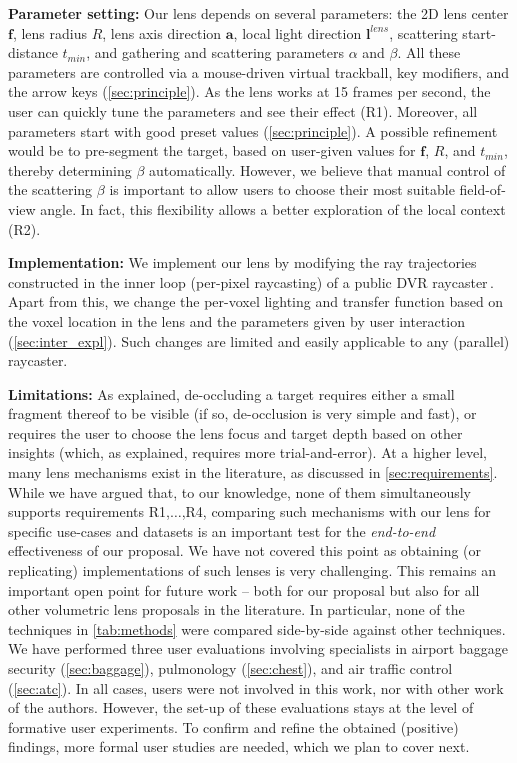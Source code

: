 \par \textbf{Parameter setting:} Our lens depends on several parameters: the 2D lens center $\mathbf{f}$, lens radius $R$, lens axis direction $\mathbf{a}$, local light direction $\mathbf{l}^{lens}$, scattering start-distance $t_{min}$, and gathering and scattering parameters $\alpha$ and $\beta$. All these parameters are controlled via a mouse-driven virtual trackball, key modifiers, and the arrow keys (\autoref{sec:principle}). As the lens works at 15 frames per second, the user can quickly tune the parameters and see their effect (R1). Moreover, all parameters start with good preset values (\autoref{sec:principle}). A possible refinement would be to pre-segment the target, based on user-given values for $\mathbf{f}$, $R$, and $t_{min}$, thereby determining $\beta$ automatically. However, we believe that manual control of the scattering $\beta$ is important to allow users to choose their most suitable field-of-view angle. In fact, this flexibility allows a better exploration of the local context (R2).


\par \textbf{Implementation:} We implement our lens by modifying the ray trajectories constructed in the inner loop (per-pixel raycasting) of a public DVR raycaster\,\cite{cudasdk}. Apart from this, we change the per-voxel lighting and transfer function based on the voxel location in the lens and the parameters given by user interaction (\autoref{sec:inter_expl}). Such changes are limited and easily applicable to any (parallel) raycaster.


\par \textbf{Limitations:} As explained, de-occluding a target requires either a small fragment thereof to be visible (if so, de-occlusion is very simple and fast), or requires the user to choose the lens focus and target depth based on other insights (which, as explained, requires more trial-and-error). At a higher level, many lens mechanisms exist in the literature, as discussed in \autoref{sec:requirements}. While we have argued that, to our knowledge, none of them simultaneously supports requirements R1,$\ldots$,R4, comparing such mechanisms with our lens for specific use-cases and datasets is an important test for the \emph{end-to-end} effectiveness of our proposal. We have not covered this point as obtaining (or replicating)  implementations of such lenses is very challenging. This remains an important open point for future work -- both for our proposal but also for all other volumetric lens proposals in the literature. In particular, none of the techniques in \autoref{tab:methods} were compared side-by-side against other techniques. We have performed three user evaluations involving specialists in airport baggage security (\autoref{sec:baggage}), pulmonology (\autoref{sec:chest}), and air traffic control (\autoref{sec:atc}). In all cases, users were not involved in this work, nor with other work of the authors. However, the set-up of these evaluations stays at the level of formative user experiments. To confirm and refine the obtained (positive) findings, more formal user studies are needed, which we plan to cover next.

